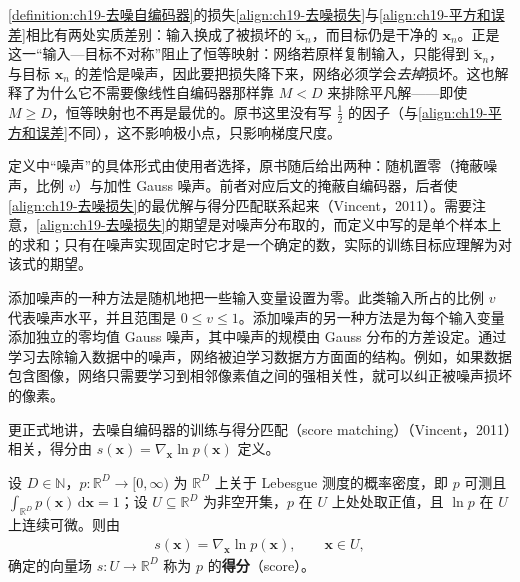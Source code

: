 \documentclass[../../main.tex]{subfiles}
\begin{document}
\begin{remark}
\cref{definition:ch19-去噪自编码器}的损失\eqref{align:ch19-去噪损失}与\eqref{align:ch19-平方和误差}相比有两处实质差别：输入换成了被损坏的 $\tilde{\bm{x}}_n$，而目标仍是干净的 $\bm{x}_n$。正是这一“输入—目标不对称”阻止了恒等映射：网络若原样复制输入，只能得到 $\tilde{\bm{x}}_n$，与目标 $\bm{x}_n$ 的差恰是噪声，因此要把损失降下来，网络必须学会\emph{去掉}损坏。这也解释了为什么它不需要像线性自编码器那样靠 $M<D$ 来排除平凡解——即使 $M\geqslant D$，恒等映射也不再是最优的。原书这里没有写 $\frac{1}{2}$ 的因子（与\eqref{align:ch19-平方和误差}不同），这不影响极小点，只影响梯度尺度。

定义中“噪声”的具体形式由使用者选择，原书随后给出两种：随机置零（掩蔽噪声，比例 $v$）与加性 Gauss 噪声。前者对应后文的掩蔽自编码器，后者使\eqref{align:ch19-去噪损失}的最优解与得分匹配联系起来（Vincent，2011）。需要注意，\eqref{align:ch19-去噪损失}的期望是对噪声分布取的，而定义中写的是单个样本上的求和；只有在噪声实现固定时它才是一个确定的数，实际的训练目标应理解为对该式的期望。
\end{remark}

添加噪声的一种方法是随机地把一些输入变量设置为零。此类输入所占的比例 $v$ 代表噪声水平，并且范围是 $0\leqslant v\leqslant 1$。添加噪声的另一种方法是为每个输入变量添加独立的零均值 Gauss 噪声，其中噪声的规模由 Gauss 分布的方差设定。通过学习去除输入数据中的噪声，网络被迫学习数据方方面面的结构。例如，如果数据包含图像，网络只需要学习到相邻像素值之间的强相关性，就可以纠正被噪声损坏的像素。

更正式地讲，去噪自编码器的训练与得分匹配（score matching）（Vincent，2011）相关，得分由 $s(\bm{x})=\nabla_{\bm{x}}\ln p(\bm{x})$ 定义。

\begin{definition}[得分]\label{definition:ch19-得分}
设 $D\in\mathbb{N}$，$p:\mathbb{R}^{D}\to[0,\infty)$ 为 $\mathbb{R}^{D}$ 上关于 Lebesgue 测度的概率密度，即 $p$ 可测且 $\int_{\mathbb{R}^{D}}p(\bm{x})\,\mathrm{d}\bm{x}=1$；设 $U\subseteq\mathbb{R}^{D}$ 为非空开集，$p$ 在 $U$ 上处处取正值，且 $\ln p$ 在 $U$ 上连续可微。则由
\begin{align*}
s(\bm{x})=\nabla_{\bm{x}}\ln p(\bm{x}),\qquad \bm{x}\in U,
\end{align*}
确定的向量场 $s:U\to\mathbb{R}^{D}$ 称为 $p$ 的\textbf{得分}（score）。
\end{definition}
\end{document}

